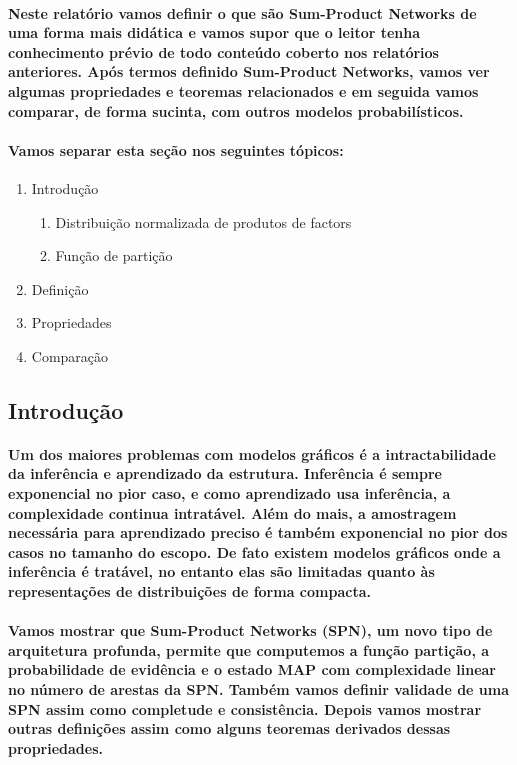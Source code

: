 \documentclass[a4paper,10pt]{article}
\theoremstyle{plain}
\begin{document}
\paragraph{
  Neste relatório vamos definir o que são Sum-Product Networks de uma forma mais didática e vamos
  supor que o leitor tenha conhecimento prévio de todo conteúdo coberto nos relatórios anteriores.
  Após termos definido Sum-Product Networks, vamos ver algumas propriedades e teoremas relacionados
  e em seguida vamos comparar, de forma sucinta, com outros modelos probabilísticos.
}

\paragraph{
  Vamos separar esta seção nos seguintes tópicos:
}

\begin{enumerate}
  \item Introdução
    \begin{enumerate}[label*=\arabic*.]
      \item Distribuição normalizada de produtos de factors
      \item Função de partição
    \end{enumerate}
  \item Definição
  \item Propriedades
  \item Comparação
\end{enumerate}

\subsection{Introdução}

\paragraph{
  Um dos maiores problemas com modelos gráficos é a intractabilidade da inferência e aprendizado
  da estrutura. Inferência é sempre exponencial no pior caso, e como aprendizado usa inferência,
  a complexidade continua intratável. Além do mais, a amostragem necessária para aprendizado
  preciso é também exponencial no pior dos casos no tamanho do escopo. De fato existem modelos
  gráficos onde a inferência é tratável, no entanto elas são limitadas quanto às representações
  de distribuições de forma compacta.
}

\paragraph{
  Vamos mostrar que Sum-Product Networks (SPN), um novo tipo de arquitetura profunda, permite que
  computemos a função partição, a probabilidade de evidência e o estado MAP\cite{report-1} com
  complexidade linear no número de arestas da SPN. Também vamos definir validade de uma SPN assim
  como completude e consistência. Depois vamos mostrar outras definições assim como alguns teoremas
  derivados dessas propriedades.
}
\end{document}
